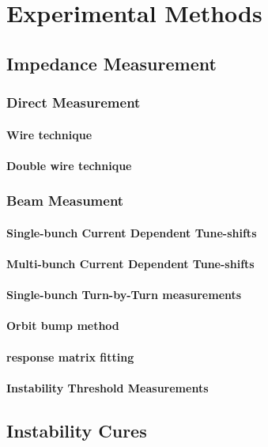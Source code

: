 \documentclass[
	12pt,				%
	openright,			%
	oneside,			%
	a4paper,		%
	chapter=TITLE,		%
	section=TITLE,		%
    brazil,				%
	english,			%
	sumario=tradicional,
	]{abntex2}
\begin{document}
\chapter{Experimental Methods}
  \section{Impedance Measurement}
    \subsection{Direct Measurement}
      \subsubsection{Wire technique}
      \subsubsection{Double wire technique}
    \subsection{Beam Measument}
      \subsubsection{Single-bunch Current Dependent Tune-shifts}
      \subsubsection{Multi-bunch Current Dependent Tune-shifts}
      \subsubsection{Single-bunch Turn-by-Turn measurements}
      \subsubsection{Orbit bump method}
      \subsubsection{response matrix fitting}
      \subsubsection{Instability Threshold Measurements}
  \section{Instability Cures}
\end{document}
